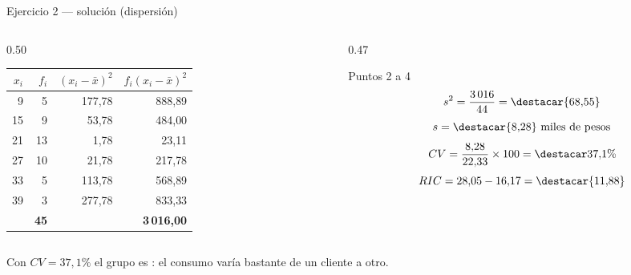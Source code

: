 \documentclass[aspectratio=169,10pt]{beamer}
\begin{document}
\begin{frame}{Ejercicio 2 — solución (dispersión)}
  \scriptsize
  \begin{columns}[T,onlytextwidth]
    \begin{column}{0.50\textwidth}
      \centering
      \begin{tabular}{@{}rrrr@{}}
        \toprule
        \textbf{$x_i$} & \textbf{$f_i$} & \textbf{$(x_i-\bar{x})^2$} &
        \textbf{$f_i(x_i-\bar{x})^2$} \\
        \midrule
         9 &  5 & 177{,}78 & 888{,}89 \\
        15 &  9 &  53{,}78 & 484{,}00 \\
        21 & 13 &   1{,}78 &  23{,}11 \\
        27 & 10 &  21{,}78 & 217{,}78 \\
        33 &  5 & 113{,}78 & 568{,}89 \\
        39 &  3 & 277{,}78 & 833{,}33 \\
        \midrule
        & \textbf{45} & & \textbf{3\,016{,}00} \\
        \bottomrule
      \end{tabular}
    \end{column}
    \begin{column}{0.47\textwidth}
      \begin{exampleblock}{Puntos 2 a 4}
        \scriptsize
        \[ s^2 = \frac{3\,016}{44} = \destacar{68{,}55} \]
        \[ s = \destacar{8{,}28} \text{ miles de pesos} \]
        \[ CV = \frac{8{,}28}{22{,}33}\times100 = \destacar{37{,}1\%} \]
        \[ RIC = 28{,}05-16{,}17 = \destacar{11{,}88} \]
      \end{exampleblock}
    \end{column}
  \end{columns}

  \vspace{0.05cm}
  {\tiny\color{uniGris} Con $CV = 37{,}1\%$ el grupo es :
  el consumo varía bastante de un cliente a otro.}
\end{frame}
\end{document}
